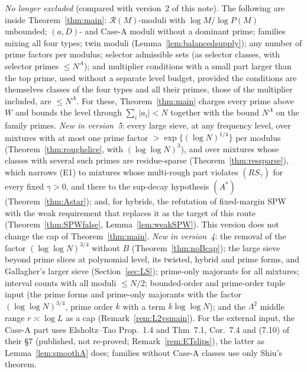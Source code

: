\documentclass[10pt,reqno]{amsart}
\theoremstyle{definition}
\theoremstyle{remark}
\newcommand{\cR}{\mathscr R}
\begin{document}
\emph{No longer excluded} (compared with version~2 of this note).  The
following are inside Theorem~\ref{thm:main}: $\cR(M)$-moduli with
$\log M/\log P(M)$ unbounded; $(a,D)$- and Case-A moduli without a dominant
prime; families mixing all four types; twin moduli
(Lemma~\ref{lem:balancedsupply}); any number of prime factors per modulus;
selector admissible sets (as selector classes, with selector primes
$\leq N^A$); and multiplier conditions with a small part larger than the
top prime, used without a separate level budget, provided the conditions
are themselves classes of the four types and all their primes, those of
the multiplier included, are $\leq N^A$.  For these,
Theorem~\ref{thm:main} charges every prime above $W$ and bounds the level
through $\sum_i|a_i|<N$ together with the bound $N^A$ on the family primes.
\emph{New in version~5}: every large sieve, at any frequency level, over
mixtures with at most one prime factor $>\exp\{(\log N)^{1/4}\}$ per modulus
(Theorem~\ref{thm:roughslice}, with $(\log\log N)^3$), and over mixtures whose
classes with several such primes are residue-sparse
(Theorem~\ref{thm:ressparse}), which narrows (E1) to mixtures whose
multi-rough part violates $(RS_\gamma)$ for every fixed $\gamma>0$, and there to the
sup-decay hypothesis $(A^*)$ (Theorem~\ref{thm:Astar}); and, for hybrids, the
refutation of fixed-margin SPW with the weak requirement that replaces it as
the target of this route
(Theorem~\ref{thm:SPWfalse}, Lemma~\ref{lem:weakSPW}).  This version does
not change the cap of Theorem~\ref{thm:main}.
\emph{New in version~4}: the removal of the factor $(\log\log N)^{3/4}$ without $B$
(Theorem~\ref{thm:noBcap}); the large sieve beyond prime slices at
polynomial level, its twisted, hybrid and prime forms, and Gallagher's
larger sieve (Section~\ref{sec:LS}); prime-only majorants for all mixtures;
interval counts with all moduli $\leq N/2$; bounded-order and
prime-order tuple input (the prime forms and prime-only majorants with
the factor $(\log\log N)^{3/4}$, prime order $k$ with a term $k\log\log N$);
and the $\Lambda^2$ middle range $r\asymp\log L$ as a
cap (Remark~\ref{rem:L2vsmain}).  For the external input, the Case-A part
uses Elsholtz--Tao Prop.~1.4 and Thm~7.1, Cor.~7.4 and (7.10) of their
\S7 (published, not re-proved; Remark~\ref{rem:ETslips}), the latter as
Lemma~\ref{lem:smoothA} does; families without Case-A classes use only
Shiu's theorem.
\end{document}
